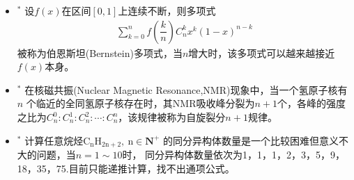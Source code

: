 \begin{itemize}[leftmargin=\inteval{\myitemleftmargin}pt,itemsep=
   \inteval{\myitemitempsep}pt,topsep=\inteval{\myitemtopsep}pt]
\item $^*$ 设$ f(x) $在区间$ [0,1] $上连续不断，则多项式
\begin{gather*}
    \sum_{k=0}^{n}f\left(\dfrac{k}{n}\right)C_n^kx^k(1-x)^{n-k}
\end{gather*}
被称为伯恩斯坦(Bernstein)多项式，当$ n $增大时，该多项式可以越来越接近$ f(x) $本身。

\item $^*$ 在核磁共振(Nuclear Magnetic Resonance,NMR)现象中，当一个氢原子核有$ n $
个临近的全同氢原子核存在时，其NMR吸收峰分裂为$ n+1 $个，各峰的强度之比为$ 
C_n^0:C_n^1:C_n^2:\cdots :C_n^n $，该规律被称为自旋裂分$ n+1 $规律。

\item $^*$ 计算任意烷烃$ \mathrm{C_nH_{2n+2},\ n}\in \textbf{N}^+ $
的同分异构体数量是一个比较困难但意义不大的问题，当$ n=1\sim 10 $时，
同分异构体数量依次为1，1，1，2，3，5，9，18，35，75.目前只能递推计算，找不出通项公式。

\end{itemize}

